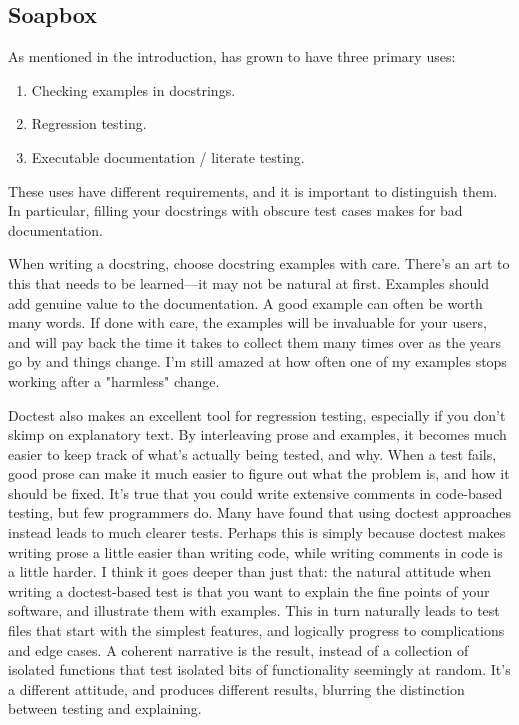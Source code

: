 \subsection{Soapbox\label{doctest-soapbox}}

As mentioned in the introduction,  has grown to have
three primary uses:

\begin{enumerate}
\item Checking examples in docstrings.
\item Regression testing.
\item Executable documentation / literate testing.
\end{enumerate}

These uses have different requirements, and it is important to
distinguish them.  In particular, filling your docstrings with obscure
test cases makes for bad documentation.

When writing a docstring, choose docstring examples with care.
There's an art to this that needs to be learned---it may not be
natural at first.  Examples should add genuine value to the
documentation.  A good example can often be worth many words.
If done with care, the examples will be invaluable for your users, and
will pay back the time it takes to collect them many times over as the
years go by and things change.  I'm still amazed at how often one of
my  examples stops working after a "harmless"
change.

Doctest also makes an excellent tool for regression testing, especially if
you don't skimp on explanatory text.  By interleaving prose and examples,
it becomes much easier to keep track of what's actually being tested, and
why.  When a test fails, good prose can make it much easier to figure out
what the problem is, and how it should be fixed.  It's true that you could
write extensive comments in code-based testing, but few programmers do.
Many have found that using doctest approaches instead leads to much clearer
tests.  Perhaps this is simply because doctest makes writing prose a little
easier than writing code, while writing comments in code is a little
harder.  I think it goes deeper than just that:  the natural attitude
when writing a doctest-based test is that you want to explain the fine
points of your software, and illustrate them with examples.  This in
turn naturally leads to test files that start with the simplest features,
and logically progress to complications and edge cases.  A coherent
narrative is the result, instead of a collection of isolated functions
that test isolated bits of functionality seemingly at random.  It's
a different attitude, and produces different results, blurring the
distinction between testing and explaining.


